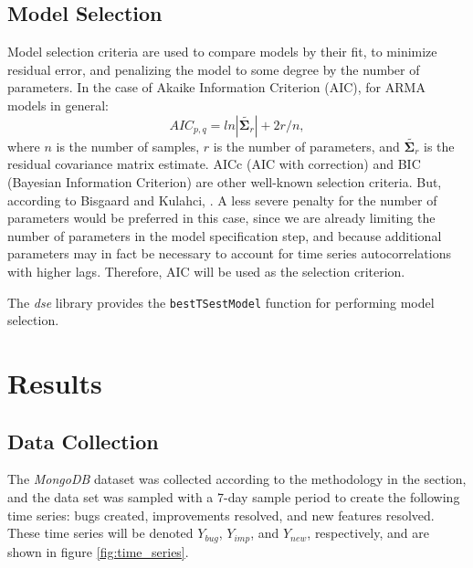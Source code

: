 \documentclass[a4paper]{scrartcl}
\begin{document}
\subsection*{Model Selection}
Model selection criteria are used to compare models by their fit, to minimize residual error, and penalizing the model to some degree by the number of parameters. In the case of Akaike Information Criterion (AIC), for ARMA models in general:
\begin{equation}
AIC_{p,q}=ln{|\tilde{\mathbf{\Sigma}_r}|}+2r/n,
\end{equation}
where $n$ is the number of samples, $r$ is the number of parameters, and  $\tilde{\mathbf{\Sigma}_r}$ is the residual covariance matrix estimate. AICc (AIC with correction) and BIC (Bayesian Information Criterion) are other well-known selection criteria. But, according to Bisgaard and Kulahci, \cite{bisgaard2011time}. A less severe penalty for the number of parameters would be preferred in this case, since we are already limiting the number of parameters in the model specification step, and because additional parameters may in fact be necessary to account for time series autocorrelations with higher lags. Therefore, AIC will be used as the selection criterion.

The \textit{dse} library provides the \texttt{bestTSestModel} function for performing model selection.

\section*{Results}
\label{sec:results}

\subsection*{Data Collection}

The \textit{MongoDB} dataset was collected according to the methodology in the  section, and the data set was sampled with a 7-day sample period to create the following time series: bugs created, improvements resolved, and new features resolved. These time series will be denoted $Y_{bug}$, $Y_{imp}$, and $Y_{new}$, respectively, and are shown in figure \ref{fig:time_series}.
\end{document}
